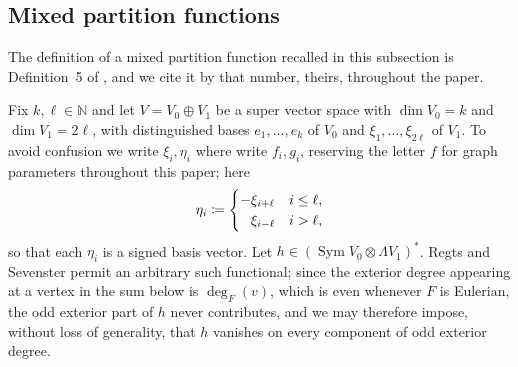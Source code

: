 \documentclass[11pt]{article}
\newcommand{\SymV}{\operatorname{Sym}}
\begin{document}
\subsection{Mixed partition functions}\label{subsec:mpf}

The definition of a mixed partition function recalled in this
subsection is Definition~5 of \cite{RS21}, and we cite it by that
number, theirs, throughout the paper.

Fix $k,\ell\in\mathbb{N}$ and let $V=V_{0}\oplus V_{1}$ be a super
vector space with $\dim V_{0}=k$ and $\dim V_{1}=2\ell$, with
distinguished bases $e_{1},\dotsc,e_{k}$ of $V_{0}$ and
$\xi_{1},\dotsc,\xi_{2\ell}$ of $V_{1}$. To avoid confusion we write
$\xi_{i},\eta_{i}$ where \cite{RS21} write $f_{i},g_{i}$, reserving
the letter $f$ for graph parameters throughout this paper; here
\[
\eta_{i}\coloneqq
\begin{cases}
-\xi_{i+\ell}& i\le \ell,\\
\hphantom{-}\xi_{i-\ell}& i>\ell,
\end{cases}
\]
so that each $\eta_{i}$ is a signed basis vector. Let
$h\in(\SymV V_{0}\otimes\Lambda V_{1})^{*}$. Regts and Sevenster
permit an arbitrary such functional; since the exterior degree
appearing at a vertex in the sum below is $\deg_{F}(v)$, which is
even whenever $F$ is Eulerian, the odd exterior part of $h$ never
contributes, and we may therefore impose, without loss of
generality, that $h$ vanishes on every component of odd exterior
degree.
\end{document}

